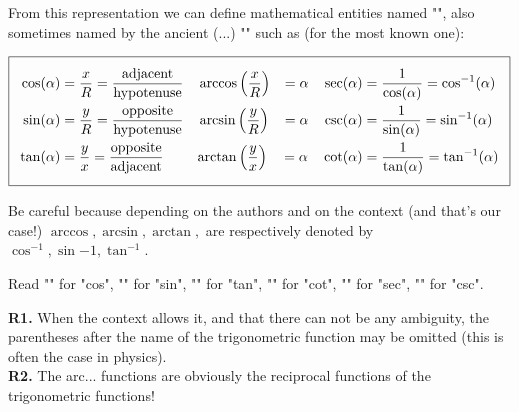 From this representation we can define mathematical entities named "", also sometimes named by the ancient (...) "" such as (for the most known one):

\begin{equation}
  \addtolength{\fboxsep}{5pt}
   \boxed{
   \begin{gathered}
   		\begin{aligned}
		\cos(\alpha)&=\dfrac{x}{R}=\dfrac{\text{adjacent}}{\text{hypotenuse}} \quad \arccos \left( \dfrac{x}{R}\right) &=\alpha \quad \sec(\alpha)&=\dfrac{1}{\cos(\alpha)}=\cos^{-1}(\alpha)\\
		\sin(\alpha)&=\dfrac{y}{R}=\dfrac{\text{opposite}}{\text{hypotenuse}} \quad \arcsin \left( \dfrac{y}{R}\right) &=\alpha \quad \csc(\alpha)&=\dfrac{1}{\sin(\alpha)}=\sin^{-1}(\alpha)\\
		\tan(\alpha)&=\dfrac{y}{x}=\dfrac{\text{opposite}}{\text{adjacent}} \qquad \; \arctan \left( \dfrac{y}{x}\right) &=\alpha \quad \cot(\alpha)&=\dfrac{1}{\tan(\alpha)}=\tan^{-1}(\alpha)
   		\end{aligned}
   \end{gathered}
   }
\end{equation}

Be careful because depending on the authors and on the context (and that's our case!) $\arccos, \arcsin, \arctan, $ are respectively denoted by $\cos^{-1}, \sin{-1}, \tan^{-1}$.

Read "" for "cos", "" for "sin", "" for "tan", "" for "cot", "" for "sec", "" for "csc".

	\begin{tcolorbox}[title=Remarks,colframe=black,arc=10pt]
	\textbf{R1.} When the context allows it, and that there can not be any ambiguity, the parentheses after the name of the trigonometric function may be omitted (this is often the case in physics).\\
	
	\textbf{R2.} The arc... functions are obviously the reciprocal functions of the trigonometric functions!
	\end{tcolorbox}

